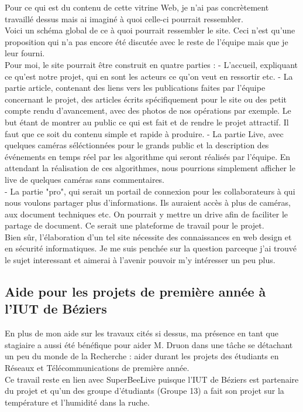 \documentclass[11pt,french,a4paper]{report}
\begin{document}
Pour ce qui est du contenu de cette vitrine Web, je n'ai pas concrètement travaillé dessus mais ai imaginé à quoi celle-ci pourrait
ressembler. \\

Voici un schéma global de ce à quoi pourrait ressembler le site. Ceci n'est qu'une proposition qui n'a pas encore
été discutée avec le reste de l'équipe mais que je leur fourni. \\
Pour moi, le site pourrait être construit en quatre parties : 
- L'accueil, expliquant ce qu'est notre projet, qui en sont les acteurs
ce qu'on veut en ressortir etc. 
- La partie article, contenant des liens vers les publications faites par l'équipe concernant le projet, des articles écrits
spécifiquement pour le site ou des petit compte rendu d'avancement, avec des photos de nos opérations par exemple. Le but 
étant de montrer au public ce qui est fait et de rendre le projet attractif. Il faut que ce soit du contenu simple et rapide
à produire. 
- La partie Live, avec quelques caméras séléctionnées pour le grands public et la description des événements en temps réel par 
les algorithme qui seront réalisés par l'équipe. En attendant la réalisation de ces algorithmes, nous pourrions simplement afficher
le live de quelques caméras sans commentaires. \\
- La partie "pro", qui serait un portail de connexion pour les collaborateurs à qui nous voulons partager plus d'informations.
Ils auraient accès à plus de caméras, aux document techniques etc. On pourrait y mettre un drive afin de faciliter le partage de 
document. Ce serait une plateforme de travail pour le projet.\\

Bien sûr, l'élaboration d'un tel site nécessite des connaissances en web design et en sécurité informatiques. Je me suis penchée
sur la question parceque j'ai trouvé le sujet interessant et aimerai à l'avenir pouvoir m'y intéresser un peu plus. \\ 


        \subsection{Aide pour les projets de première année à l'IUT de Béziers}

En plus de mon aide sur les travaux cités si dessus, ma présence en tant que stagiaire a aussi été bénéfique pour aider M. Druon 
dans une tâche se détachant un peu du monde de la Recherche : aider durant les projets des étudiants en Réseaux et Télécommunications 
de première année. \\
Ce travail reste en lien avec SuperBeeLive puisque l'IUT de Béziers est partenaire du projet et qu'un des groupe d'étudiants (Groupe 13) 
a fait son projet sur la température et l'humidité dans la ruche. \\
\end{document}
